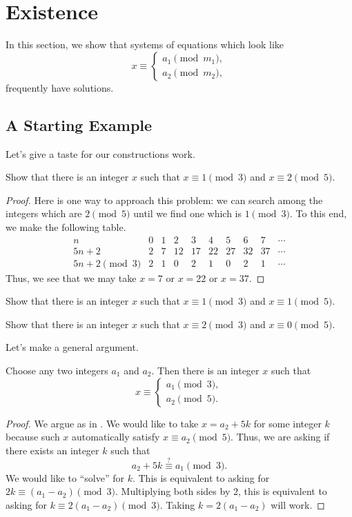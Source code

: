 \documentclass{article}
\begin{document}
\section{Existence} \label{sec:existence}
In this section, we show that systems of equations which look like
\[x\equiv\begin{cases}
	a_1\pmod{m_1}, \\
	a_2\pmod{m_2},
\end{cases}\]
frequently have solutions.

\subsection{A Starting Example}
Let's give a taste for our constructions work.
\begin{example} \label{ex:1-m3-2-m5}
	Show that there is an integer $x$ such that $x\equiv1\pmod3$ and $x\equiv2\pmod5$.
\end{example}
\begin{proof}
	Here is one way to approach this problem: we can search among the integers which are $2\pmod5$ until we find one which is $1\pmod3$. To this end, we make the following table.
	\[\begin{array}{c|ccccccccc}
		n & 0 & 1 & 2 & 3 & 4 & 5 & 6 & 7 & \cdots \\\hline
		5n+2 & 2 & 7 & 12 & 17 & 22 & 27 & 32 & 37 & \cdots \\
		5n+2\pmod3 & 2 & 1 & 0 & 2 & 1 & 0 & 2 & 1 & \cdots
	\end{array}\]
	Thus, we see that we may take $x=7$ or $x=22$ or $x=37$.
\end{proof}
\begin{exe}
	Show that there is an integer $x$ such that $x\equiv1\pmod3$ and $x\equiv1\pmod5$.
\end{exe}
\begin{exe}
	Show that there is an integer $x$ such that $x\equiv2\pmod3$ and $x\equiv0\pmod5$.
\end{exe}
Let's make a general argument.
\begin{proposition} \label{prop:construct-crt-mod-3-mod-5}
	Choose any two integers $a_1$ and $a_2$. Then there is an integer $x$ such that
	\[x\equiv\begin{cases}
		a_1\pmod3, \\
		a_2\pmod5.
	\end{cases}\]
\end{proposition}
\begin{proof}
	We argue as in . We would like to take $x=a_2+5k$ for some integer $k$ because such $x$ automatically satisfy $x\equiv a_2\pmod5$. Thus, we are asking if there exists an integer $k$ such that
	\[a_2+5k\stackrel?\equiv a_1\pmod3.\]
	We would like to ``solve'' for $k$. This is equivalent to asking for $2k\equiv(a_1-a_2)\pmod3$. Multiplying both sides by $2$, this is equivalent to asking for $k\equiv2(a_1-a_2)\pmod3$. Taking $k=2(a_1-a_2)$ will work.
\end{proof}
\end{document}
